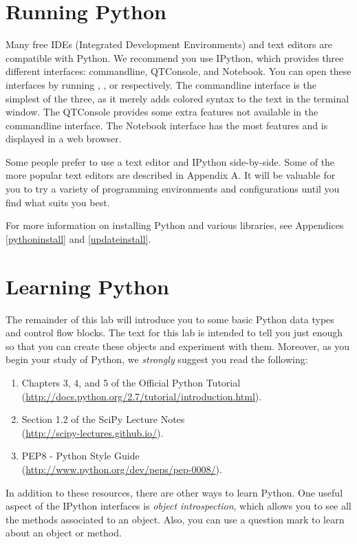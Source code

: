 \section*{Running Python}
Many free IDEs (Integrated Development Environments) and text editors are compatible with Python. We recommend you use IPython, which provides three different interfaces: commandline, QTConsole, and Notebook. You can open these interfaces by running , , or  respectively.
The commandline interface is the simplest of the three, as it merely adds colored syntax to the text in the terminal window.
The QTConsole provides some extra features not available in the commandline interface.
The Notebook interface has the most features and is displayed in a web browser.

Some people prefer to use a text editor and IPython side-by-side. Some of the more popular text editors are described in Appendix A. It will be valuable for you to try a variety of programming environments and configurations until you find what suits you best.

For more information on installing Python and various libraries, see Appendices \ref{pythoninstall} and \ref{updateinstall}.

\section*{Learning Python}
The remainder of this lab will introduce you to some basic Python data types and control flow blocks. The text for this lab is intended to tell you just enough so that you can create these objects and experiment with them. Moreover, as you begin your study of Python, we \emph{strongly} suggest you read the following:
\begin{enumerate}
\item Chapters 3, 4, and 5 of the Official Python Tutorial \\
        (\url{http://docs.python.org/2.7/tutorial/introduction.html}).
\item Section 1.2 of the SciPy Lecture Notes\\
        (\url{http://scipy-lectures.github.io/}).
\item PEP8 - Python Style Guide \\
        (\url{http://www.python.org/dev/peps/pep-0008/}).
\end{enumerate}

In addition to these resources, there are other ways to learn Python. One useful aspect of the IPython interfaces is \emph{object introspection}, which allows you to see all the methods associated to an object. Also, you can use a question mark to learn about an object or method.

